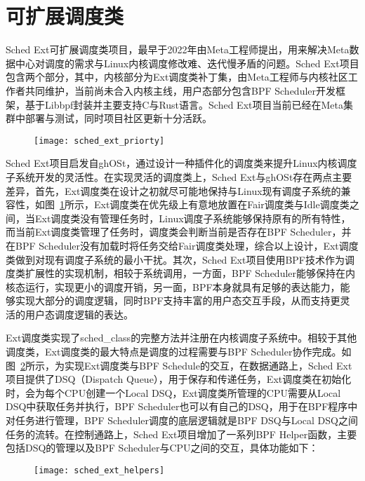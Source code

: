 \section{可扩展调度类}

Sched Ext可扩展调度类项目\citep{schedext}，最早于2022年由Meta工程师提出，用来解决Meta数据中心对调度的需求与Linux内核调度修改难、迭代慢矛盾的问题。Sched Ext项目包含两个部分，其中，内核部分为Ext调度类补丁集，由Meta工程师与内核社区工作者共同维护，当前尚未合入内核主线，用户态部分包含BPF Scheduler开发框架，基于Libbpf封装并主要支持C与Rust语言。Sched Ext项目当前已经在Meta集群中部署与测试，同时项目社区更新十分活跃。
\begin{figure}[!htbp]
    \centering
    \texttt{[image: sched\_ext\_priorty]}
    \label{fig:sched_ext_priorty}
\end{figure}

Sched Ext项目启发自ghOSt\citep{humphries2021ghost}，通过设计一种插件化的调度类来提升Linux内核调度子系统开发的灵活性。在实现灵活的调度类上，Sched Ext与ghOSt存在两点主要差异，首先，Ext调度类在设计之初就尽可能地保持与Linux现有调度子系统的兼容性，如图~\ref{fig:sched_ext_priorty}所示，Ext调度类在优先级上有意地放置在Fair调度类与Idle调度类之间，当Ext调度类没有管理任务时，Linux调度子系统能够保持原有的所有特性，而当前Ext调度类管理了任务时，调度类会判断当前是否存在BPF Scheduler，并在BPF Scheduler没有加载时将任务交给Fair调度类处理，综合以上设计，Ext调度类做到对现有调度子系统的最小干扰。其次，Sched Ext项目使用BPF技术作为调度类扩展性的实现机制，相较于系统调用，一方面，BPF Scheduler能够保持在内核态运行，实现更小的调度开销，另一面，BPF本身就具有足够的表达能力，能够实现大部分的调度逻辑，同时BPF支持丰富的用户态交互手段，从而支持更灵活的用户态调度逻辑的表达。

Ext调度类实现了sched\_class的完整方法并注册在内核调度子系统中。相较于其他调度类，Ext调度类的最大特点是调度的过程需要与BPF Scheduler协作完成。如图~\ref{fig:sched_ext_helpers}所示，为实现Ext调度类与BPF Schedule的交互，在数据通路上，Sched Ext项目提供了DSQ（Dispatch Queue），用于保存和传递任务，Ext调度类在初始化时，会为每个CPU创建一个Local DSQ，Ext调度类所管理的CPU需要从Local DSQ中获取任务并执行，BPF Scheduler也可以有自己的DSQ，用于在BPF程序中对任务进行管理，BPF Scheduler调度的底层逻辑就是BPF DSQ与Local DSQ之间任务的流转。在控制通路上，Sched Ext项目增加了一系列BPF Helper函数，主要包括DSQ的管理以及BPF Scheduler与CPU之间的交互，具体功能如下：

\begin{figure}[!htbp]
    \centering
    \texttt{[image: sched\_ext\_helpers]}
    \label{fig:sched_ext_helpers}
\end{figure}

